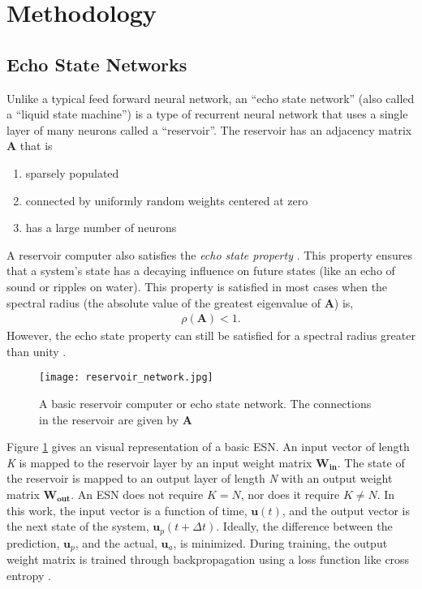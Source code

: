 \section{Methodology}

\subsection{Echo State Networks}
Unlike a typical feed forward neural network, an ``echo state network'' (also
called a ``liquid state machine'') is a type of
recurrent neural network that uses a single layer of many neurons called a
``reservoir''. The reservoir has an adjacency matrix $\bm{A}$ that is
\begin{enumerate}
	\item sparsely populated
	\item connected by uniformly random weights centered at zero
	\item has a large number of neurons
\end{enumerate}
A reservoir computer also satisfies the \textit{echo state property}
\cite{pathak_model-free_2018, lukosevicius_reservoir_2009}. This
property ensures that a system's state has a decaying influence on future states
(like an echo of sound or ripples on water). This property is satisfied in most
cases when the spectral radius (the absolute value of the greatest eigenvalue of
$\bm{A}$)\cite{lukosevicius_reservoir_2009} is,
\begin{align}
	\rho(\bm{A}) < 1.
\end{align}
However, the echo state property can still be satisfied for a spectral radius
greater than unity \cite{lukosevicius_practical_2012}.

\begin{figure}[H]
	\texttt{[image: reservoir\_network.jpg]}
	\caption{A basic reservoir computer or echo state network. The connections in
	the reservoir are given by $\bm{A}$}
	\label{fig:RCmodel}
\end{figure}

Figure \ref{fig:RCmodel} gives an visual representation of a basic
\acrshort{ESN}. An
input vector of length \textit{K} is mapped to the reservoir layer by an input
weight matrix $\bm{W_{in}}$. The state of the reservoir is mapped to an output
layer of length \textit{N} with an output weight matrix $\bm{W_{out}}$. An ESN
does not require $K=N$, nor does it require $K \neq N$. In this
work, the input vector is a function of time, $\bm{u}(t)$, and the output
vector is the next state of the system, $\bm{u}_p(t+\Delta t)$. Ideally, the
difference between the prediction, $\bm{u}_p$, and the actual, $\bm{u}_a$, is
minimized. During training, the output weight matrix is trained through
backpropagation using a loss function like cross entropy
\cite{pathak_model-free_2018, vlachas_backpropagation_2020}.

